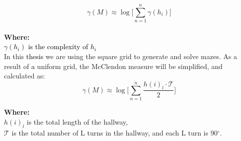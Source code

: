 \begin{equation}
\gamma(M) \approx \log \bigl[\sum_{n =1}^{n}\gamma(h_i)\bigr]
\end{equation}
\\
\textbf{Where:}\\
\textcolor{black}{$\gamma(h_i)$ is the complexity of $h_i$}\\
 \newline
In this \textcolor{black}{thesis} we are using the square grid to generate and solve mazes. As a result of \textcolor{black}{a} uniform grid, the McClendon measure will be simplified, and calculated as:
\begin{equation} 
\gamma(M) \approx \log \bigl[\sum_{n =1}^{n}\frac{h(i)_l\cdot \mathcal{T}}{2}\bigr]
\end{equation}

\textbf{Where:}\\
$h(i)_l$ is the total length of the hallway,\\
$\mathcal{T}$ is the total number of L turns in the hallway, and each L turn is 90$^\circ$.%
